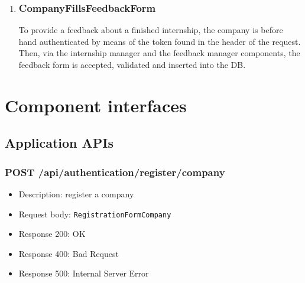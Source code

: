 \begin{enumerate}[label=\textbf{RV\arabic* -}]
\item \subsubsection{CompanyFillsFeedbackForm}

To provide a feedback about a finished internship, the company is before hand authenticated by means of the token found in the header of the request.
Then, via the internship manager and the feedback manager components, the feedback form is accepted, validated and inserted into the DB.

\begin{figure}[H]
    \centering
\end{figure}

\end{enumerate}

\section{Component interfaces}

\subsection{Application APIs}

\subsubsection{POST /api/authentication/register/company}
\begin{itemize}
    \item Description: register a company
    \item Request body: \verb|RegistrationFormCompany|
    \item Response 200: OK
    \item Response 400: Bad Request
    \item Response 500: Internal Server Error
\end{itemize}

